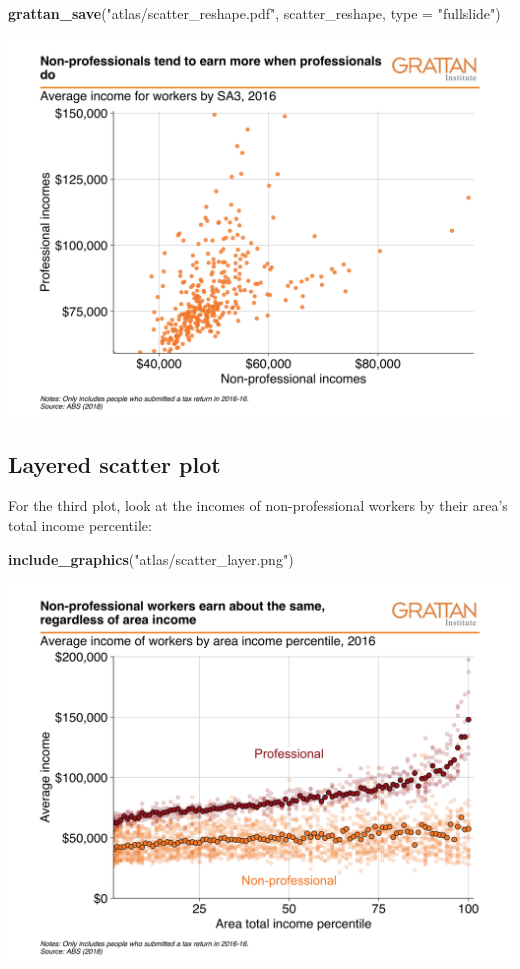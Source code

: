 \documentclass[]{book}
\newenvironment{Shaded}{\begin{snugshade}}{\end{snugshade}}
\newcommand{\DataTypeTok}[1]{\textcolor[rgb]{0.13,0.29,0.53}{#1}}
\newcommand{\KeywordTok}[1]{\textcolor[rgb]{0.13,0.29,0.53}{\textbf{#1}}}
\newcommand{\NormalTok}[1]{#1}
\newcommand{\StringTok}[1]{\textcolor[rgb]{0.31,0.60,0.02}{#1}}
\begin{document}
\begin{Shaded}
\begin{Highlighting}[]
\KeywordTok{grattan_save}\NormalTok{(}\StringTok{"atlas/scatter_reshape.pdf"}\NormalTok{, scatter_reshape, }\DataTypeTok{type =} \StringTok{"fullslide"}\NormalTok{)}
\end{Highlighting}
\end{Shaded}

\includegraphics[width=44.44in]{atlas/scatter_reshape}

\hypertarget{layered-scatter-plot}{%
\subsection{Layered scatter plot}\label{layered-scatter-plot}}

For the third plot, look at the incomes of non-professional workers by their area's total income percentile:

\begin{Shaded}
\begin{Highlighting}[]
\KeywordTok{include_graphics}\NormalTok{(}\StringTok{"atlas/scatter_layer.png"}\NormalTok{)}
\end{Highlighting}
\end{Shaded}

\includegraphics[width=44.44in]{atlas/scatter_layer}
\end{document}

